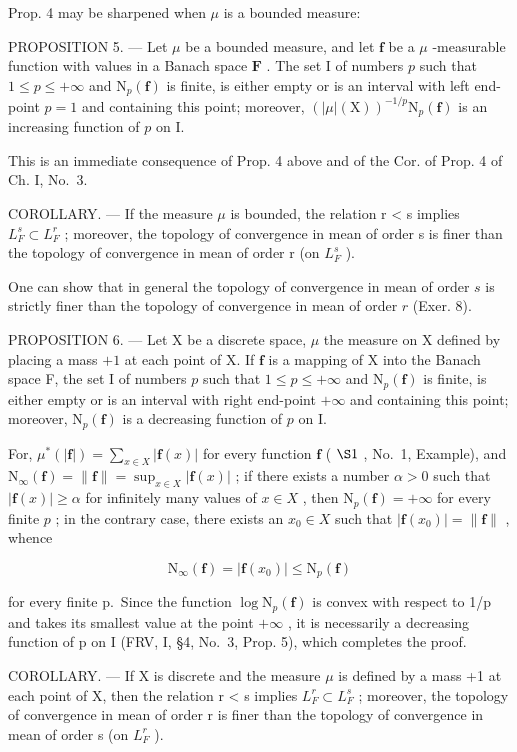 Prop. 4 may be sharpened when \(\mu\) is a bounded measure:

PROPOSITION 5. --- Let \(\mu\) be a bounded measure, and let \(\mathbf{f}\) be a \(\mu\) -measurable function with values in a Banach space \(\mathbf{F}\) . The set I of numbers \(p\) such that \(1 \leqslant p \leqslant +\infty\) and \(\mathrm{N}_p(\mathbf{f})\) is finite, is either empty or is an interval with left end-point \(p = 1\) and containing this point; moreover, \((|\mu|(\mathrm{X}))^{-1/p} \mathrm{N}_p(\mathbf{f})\) is an increasing function of \(p\) on I.

This is an immediate consequence of Prop. 4 above and of the Cor. of Prop. 4 of Ch. I, No.~3.

COROLLARY. --- If the measure \(\mu\) is bounded, the relation r < s implies \(L_{F}^{s} \subset L_{F}^{r}\) ; moreover, the topology of convergence in mean of order s is finer than the topology of convergence in mean of order r (on \(L_{F}^{s}\) ).

One can show that in general the topology of convergence in mean of order \(s\) is strictly finer than the topology of convergence in mean of order \(r\) (Exer. 8).

PROPOSITION 6. --- Let X be a discrete space, \(\mu\) the measure on X defined by placing a mass \(+1\) at each point of X. If \(\mathbf{f}\) is a mapping of X into the Banach space F, the set I of numbers \(p\) such that \(1 \leqslant p \leqslant +\infty\) and \(\mathrm{N}_p(\mathbf{f})\) is finite, is either empty or is an interval with right end-point \(+\infty\) and containing this point; moreover, \(\mathrm{N}_p(\mathbf{f})\) is a decreasing function of \(p\) on I.

For, \(\mu^{*}(|\mathbf{f}|) = \sum_{x\in X}|\mathbf{f}(x)|\) for every function \(\mathbf{f}\) ( \(\S 1\) , No.~1, Example), and \(\mathrm{N}_{\infty}(\mathbf{f}) = \| \mathbf{f}\| = \sup_{x\in X}|\mathbf{f}(x)|\) ; if there exists a number \(\alpha >0\) such that \(|\mathbf{f}(x)|\geqslant \alpha\) for infinitely many values of \(x\in X\) , then \(\mathrm{N}_p(\mathbf{f}) = +\infty\) for every finite \(p\) ; in the contrary case, there exists an \(x_0\in X\) such that \(|\mathbf{f}(x_0)| = \| \mathbf{f}\|\) , whence

\[
\mathrm{N} _ {\infty} (\mathbf {f}) = | \mathbf {f} (x _ {0}) | \leqslant \mathrm{N} _ {p} (\mathbf {f})
\]

for every finite p.~Since the function \(\log\mathrm{N}_{p}(\mathbf{f})\) is convex with respect to 1/p and takes its smallest value at the point \(+\infty\) , it is necessarily a decreasing function of p on I (FRV, I, §4, No.~3, Prop. 5), which completes the proof.

COROLLARY. --- If X is discrete and the measure \(\mu\) is defined by a mass +1 at each point of X, then the relation r < s implies \(L_{F}^{r} \subset L_{F}^{s}\) ; moreover, the topology of convergence in mean of order r is finer than the topology of convergence in mean of order s (on \(L_{F}^{r}\) ).

